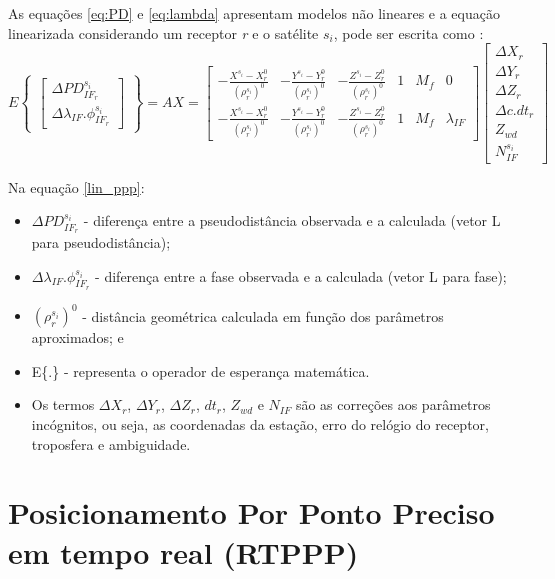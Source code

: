 As equações \ref{eq:PD} e \ref{eq:lambda} apresentam modelos não lineares e a equação linearizada considerando um receptor \textit{r} e o satélite $s_i$, pode ser escrita como \citep{marques2014ppp}:
\begin{equation}
\label{lin_ppp}
E
\begin{Bmatrix}
\begin{bmatrix}
\Delta PD_{IF_r}^{s_i}\\
\Delta \lambda_{IF}.\phi_{IF_r}^{s_i}
\end{bmatrix}
\end{Bmatrix}
=AX=
\begin{bmatrix}
-\frac{X^{s_i}-X^0_r}{(\rho^{s_i}_r)^0} & -\frac{Y^{s_i}-Y^0_r}{(\rho^{s_i}_r)^0}& -\frac{Z^{s_i}-Z^0_r}{(\rho^{s_i}_r)^0} & 1 & M_f & 0\\
-\frac{X^{s_i}-X^0_r}{(\rho^{s_i}_r)^0} & -\frac{Y^{s_i}-Y^0_r}{(\rho^{s_i}_r)^0}& -\frac{Z^{s_i}-Z^0_r}{(\rho^{s_i}_r)^0} & 1 & M_f & \lambda_{IF}
\end{bmatrix}
\begin{bmatrix}
\Delta X_r\\
\Delta Y_r\\
\Delta Z_r\\
\Delta c.dt_r\\
Z_{wd}\\
N^{s_i}_{IF}
\end{bmatrix}
\end{equation}

Na equação \ref{lin_ppp}:
\begin{itemize}
    \item $\Delta PD_{IF_r}^{s_i}$ - diferença entre a pseudodistância observada e a calculada (vetor L para pseudodistância);
    \item $\Delta \lambda_{IF}.\phi_{IF_r}^{s_i}$ - diferença entre a fase observada e a calculada (vetor L para fase);
    \item $(\rho^{s_i}_r)^0$ - distância geométrica calculada em função dos parâmetros aproximados; e
    \item E\{.\} - representa o operador de esperança matemática.
    \item Os termos $\Delta X_r$, $\Delta Y_r$, $\Delta Z_r$, $dt_r$, $Z_{wd}$ e $N_{IF}$ são as correções aos parâmetros incógnitos, ou seja, as coordenadas da estação, erro do relógio do receptor, troposfera e ambiguidade.
\end{itemize}


\section{Posicionamento Por Ponto Preciso em tempo real (RTPPP)}

